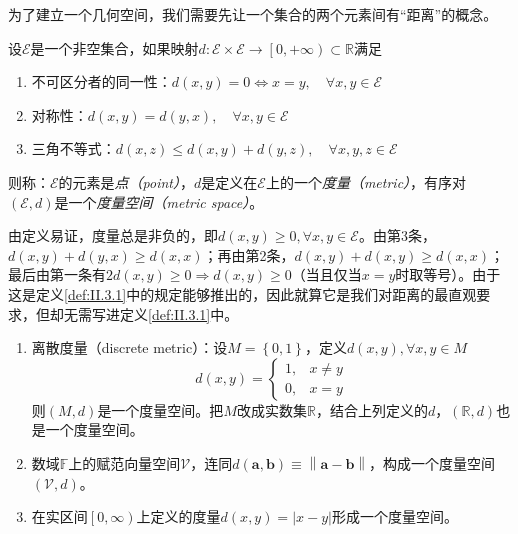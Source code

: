 \documentclass[../main.tex]{subfiles}
\begin{document}
为了建立一个几何空间，我们需要先让一个集合的两个元素间有“距离”的概念。

\begin{definition}[度量空间]\label{def:II.3.1}
    设$\mathcal{E}$是一个非空集合，如果映射$d:\mathcal{E}\times\mathcal{E}\rightarrow\left[0,+\infty\right)\subset\mathbb{R}$满足
    \begin{enumerate}
        \item 不可区分者的同一性：$d\left(x,y\right)=0\Leftrightarrow x=y,\quad\forall x,y\in\mathcal{E}$
        \item 对称性：$d\left(x,y\right)=d\left(y,x\right),\quad\forall x,y\in\mathcal{E}$
        \item 三角不等式：$d\left(x,z\right)\leq d\left(x,y\right)+d\left(y,z\right),\quad\forall x,y,z\in\mathcal{E}$
    \end{enumerate}
    则称：$\mathcal{E}$的元素是\emph{点（point）}，$d$是定义在$\mathcal{E}$上的一个\emph{度量（metric）}，有序对$\left(\mathcal{E},d\right)$是一个\emph{度量空间（metric space）}。
\end{definition}

由定义易证，度量总是非负的，即$d\left(x,y\right)\geq0,\forall x,y\in\mathcal{E}$。由第3条，$d\left(x,y\right)+d\left(y,x\right)\geq d\left(x,x\right)$；再由第2条，$d\left(x,y\right)+d\left(x,y\right)\geq d\left(x,x\right)$；最后由第一条有$2d\left(x,y\right)\geq0\Rightarrow d\left(x,y\right)\geq0$（当且仅当$x=y$时取等号）。由于这是定义\ref{def:II.3.1}中的规定能够推出的，因此就算它是我们对距离的最直观要求，但却无需写进定义\ref{def:II.3.1}中。

\begin{example}\label{exp:II.3.1}
    \begin{enumerate}
        \item 离散度量（discrete metric）：设$M=\left\{0,1\right\}$，定义$d\left(x,y\right),\forall x,y\in M$
              \[d\left(x,y\right)=\left\{\begin{array}{ll}1,&x\neq y\\0,&x=y\end{array}\right.\]
              则$\left(M,d\right)$是一个度量空间。把$M$改成实数集$\mathbb{R}$，结合上列定义的$d$，$\left(\mathbb{R},d\right)$也是一个度量空间。
        \item 数域$\mathbb{F}$上的赋范向量空间$\mathcal{V}$，连同$d\left(\mathbf{a},\mathbf{b}\right)\equiv\left\|\mathbf{a}-\mathbf{b}\right\|$，构成一个度量空间$\left(\mathcal{V},d\right)$。
        \item 在实区间$\left[0,\infty\right)$上定义的度量$d\left(x,y\right)=\left|x-y\right|$形成一个度量空间。
    \end{enumerate}
\end{example}
\end{document}
